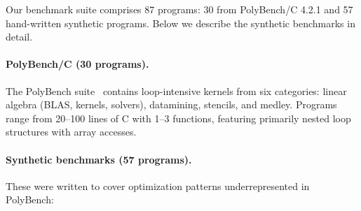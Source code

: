 \documentclass[11pt]{article}
\begin{document}
Our benchmark suite comprises 87 programs: 30 from PolyBench/C 4.2.1 and 57 hand-written synthetic programs. Below we describe the synthetic benchmarks in detail.

\paragraph{PolyBench/C (30 programs).} The PolyBench suite~\citep{pouchet2012polybench} contains loop-intensive kernels from six categories: linear algebra (BLAS, kernels, solvers), datamining, stencils, and medley. Programs range from 20--100 lines of C with 1--3 functions, featuring primarily nested loop structures with array accesses.

\paragraph{Synthetic benchmarks (57 programs).} These were written to cover optimization patterns underrepresented in PolyBench:
\end{document}
